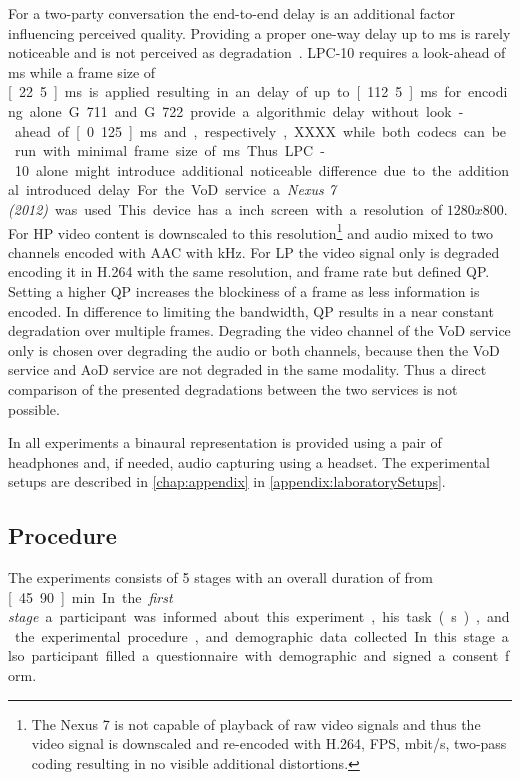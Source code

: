 For a two-party conversation the end-to-end delay is an additional factor influencing perceived quality.
Providing a proper one-way delay up to \unit[100]{ms} is rarely noticeable and is not perceived as degradation~\citep[\cf,][p. 9]{itu-t_g.107:_2005}.
LPC-10 requires a look-ahead of \unit[90]{ms} while a frame size of \unit[22.5]{ms} is applied resulting in an delay of up to \unit[112.5]{ms} for encoding alone.
G.711 and G.722 provide a algorithmic delay without look-ahead of \unit[0.125]{ms} and, respectively, XXXX while both codecs can be run with minimal frame size of \unit[10]{ms}. %
Thus LPC-10 alone might introduce additional noticeable difference due to the additional introduced delay.

For the \ac{VoD} service a \emph{Nexus 7 (2012)} was used.
This device has a \unit[7]{inch} screen with a resolution of $1280x800$.
For \ac{HP} video content is downscaled to this resolution\footnote{The Nexus 7 is not capable of playback of raw video signals and thus the video signal is downscaled and re-encoded with H.264, \unit[25]{\ac{FPS}}, \unit[5]{mbit/s}, two-pass coding resulting in no visible additional distortions.} and audio mixed to two channels encoded with \ac{AAC} with \unit[48]{kHz}.
For \ac{LP} the video signal only is degraded encoding it in H.264 with the same resolution, and frame rate but defined \ac{QP}.
Setting a higher \ac{QP} increases the blockiness of a frame as less information is encoded.
In difference to limiting the bandwidth, \ac{QP} results in a near constant degradation over multiple frames.  %
Degrading the video channel of the \ac{VoD} service only is chosen over degrading the audio or both channels, because then the \ac{VoD} service and \ac{AoD} service are not degraded in the same modality.
Thus a direct comparison of the presented degradations between the two services is not possible.

In all experiments a binaural representation is provided using a pair of headphones and, if needed, audio capturing using a headset.
The experimental setups are described in \autoref{chap:appendix} in \autoref{appendix:laboratorySetups}.

\subsection{Procedure} %
The experiments consists of 5 stages with an overall duration of from \unit[45...90]{min}.
In the \emph{first stage} a participant was informed about this experiment, his task(s), and the experimental procedure, and demographic data collected.
In this stage also participant filled a questionnaire with demographic and signed a consent form.

